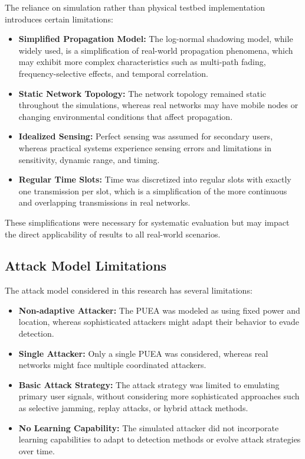 The reliance on simulation rather than physical testbed implementation introduces certain limitations:

\begin{itemize}
    \item \textbf{Simplified Propagation Model:} The log-normal shadowing model, while widely used, is a simplification of real-world propagation phenomena, which may exhibit more complex characteristics such as multi-path fading, frequency-selective effects, and temporal correlation.
    
    \item \textbf{Static Network Topology:} The network topology remained static throughout the simulations, whereas real networks may have mobile nodes or changing environmental conditions that affect propagation.
    
    \item \textbf{Idealized Sensing:} Perfect sensing was assumed for secondary users, whereas practical systems experience sensing errors and limitations in sensitivity, dynamic range, and timing.
    
    \item \textbf{Regular Time Slots:} Time was discretized into regular slots with exactly one transmission per slot, which is a simplification of the more continuous and overlapping transmissions in real networks.
\end{itemize}

These simplifications were necessary for systematic evaluation but may impact the direct applicability of results to all real-world scenarios.

\subsection{Attack Model Limitations}

The attack model considered in this research has several limitations:

\begin{itemize}
    \item \textbf{Non-adaptive Attacker:} The PUEA was modeled as using fixed power and location, whereas sophisticated attackers might adapt their behavior to evade detection.
    
    \item \textbf{Single Attacker:} Only a single PUEA was considered, whereas real networks might face multiple coordinated attackers.
    
    \item \textbf{Basic Attack Strategy:} The attack strategy was limited to emulating primary user signals, without considering more sophisticated approaches such as selective jamming, replay attacks, or hybrid attack methods.
    
    \item \textbf{No Learning Capability:} The simulated attacker did not incorporate learning capabilities to adapt to detection methods or evolve attack strategies over time.
\end{itemize}


